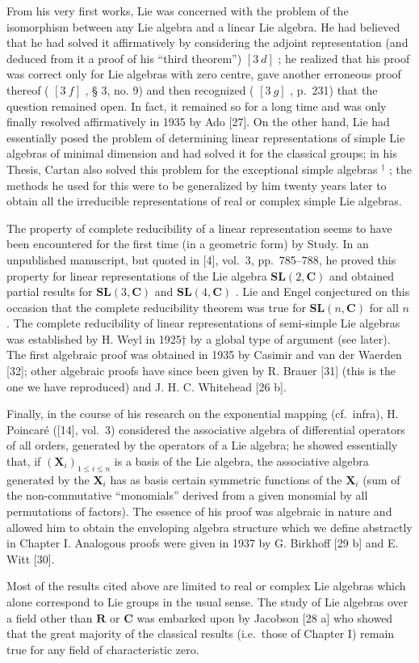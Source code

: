 From his very first works, Lie was concerned with the problem of the isomorphism between any Lie algebra and a linear Lie algebra. He had believed that he had solved it affirmatively by considering the adjoint representation (and deduced from it a proof of his ``third theorem'') \([3\ d]\) ; he realized that his proof was correct only for Lie algebras with zero centre, gave another erroneous proof thereof ( \([3\ f]\) , § 3, no. 9) and then recognized ( \([3\ g]\) , p.~231) that the question remained open. In fact, it remained so for a long time and was only finally resolved affirmatively in 1935 by Ado {[}27{]}. On the other hand, Lie had essentially posed the problem of determining linear representations of simple Lie algebras of minimal dimension and had solved it for the classical groups; in his Thesis, Cartan also solved this problem for the exceptional simple algebras \(^{\dagger}\) ; the methods he used for this were to be generalized by him twenty years later to obtain all the irreducible representations of real or complex simple Lie algebras.

The property of complete reducibility of a linear representation seems to have been encountered for the first time (in a geometric form) by Study. In an unpublished manuscript, but quoted in {[}4{]}, vol.~3, pp.~785--788, he proved this property for linear representations of the Lie algebra \(\mathbf{SL}(2,\mathbf{C})\) and obtained partial results for \(\mathbf{SL}(3,\mathbf{C})\) and \(\mathbf{SL}(4,\mathbf{C})\) . Lie and Engel conjectured on this occasion that the complete reducibility theorem was true for \(\mathbf{SL}(n,\mathbf{C})\) for all \(n\) . The complete reducibility of linear representations of semi-simple Lie algebras was established by H. Weyl in 1925† by a global type of argument (see later). The first algebraic proof was obtained in 1935 by Casimir and van der Waerden {[}32{]}; other algebraic proofs have since been given by R. Brauer {[}31{]} (this is the one we have reproduced) and J. H. C. Whitehead {[}26 b{]}.

Finally, in the course of his research on the exponential mapping (cf.~infra), H. Poincaré ({[}14{]}, vol.~3) considered the associative algebra of differential operators of all orders, generated by the operators of a Lie algebra; he showed essentially that, if \((\mathbf{X}_i)_{1\leqslant i\leqslant n}\) is a basis of the Lie algebra, the associative algebra generated by the \(\mathbf{X}_i\) has as basis certain symmetric functions of the \(\mathbf{X}_i\) (sum of the non-commutative ``monomials'' derived from a given monomial by all permutations of factors). The essence of his proof was algebraic in nature and allowed him to obtain the enveloping algebra structure which we define abstractly in Chapter I. Analogous proofs were given in 1937 by G. Birkhoff {[}29 b{]} and E. Witt {[}30{]}.

Most of the results cited above are limited to real or complex Lie algebras which alone correspond to Lie groups in the usual sense. The study of Lie algebras over a field other than \(\mathbf{R}\) or \(\mathbf{C}\) was embarked upon by Jacobson {[}28 a{]} who showed that the great majority of the classical results (i.e.~those of Chapter I) remain true for any field of characteristic zero.

